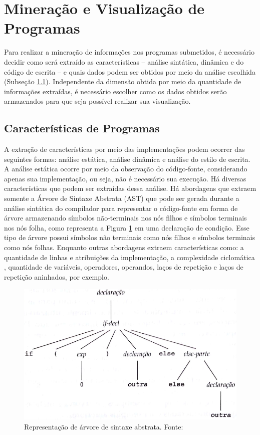 	\section{Mineração e Visualização de Programas}
	\label{sec:MinVisual}
		Para realizar a mineração de informações nos programas submetidos, é necessário
		decidir como será extraído as características -- análise sintática, dinâmica e
		do código de escrita -- e quais dados podem ser obtidos por meio da análise
		escolhida (Subseção \ref{subSec:Caracteristicas}). Independente da dimensão
		obtida por meio da quantidade de informações extraídas, é necessário escolher
		como os dados obtidos serão armazenados para que seja possível realizar sua visualização.
		
		\subsection{Características de Programas}
		\label{subSec:Caracteristicas}

			A extração de características por meio das implementações podem ocorrer das
			seguintes formas: análise estática, análise dinâmica e análise do estilo de escrita.
			A análise estática ocorre por meio da observação do código-fonte, considerando
			apenas sua implementação, ou seja, não é necessário sua execução. Há diversas
			características que podem ser extraídas dessa análise. Há abordagens que extraem
			somente a Árvore de Sintaxe Abstrata (AST) que pode ser gerada durante a análise
			sintática do compilador para representar o código-fonte em forma de árvore
			armazenando símbolos não-terminais nos nós filhos e símbolos terminais nos
			nós folha, como representa a Figura \ref{fig:AST} em uma declaração de condição.
			Esse tipo de árvore possui símbolos não terminais como nós filhos
			e símbolos terminais como nós folhas. Enquanto outras abordagens extraem
			características como: a quantidade de linhas e atribuições da implementação,
			a complexidade ciclomática \cite{mccabe}, quantidade de variáveis, operadores,
			operandos, laços de repetição e laços de repetição aninhados, por exemplo.
						
			\begin{figure}[h]
				\centering
				\includegraphics[width=0.7\linewidth]{imagem/AST}
				\captionsetup{justification=centering}
				\caption[Representação de árvore de sintaxe abstrata]{Representação
				de árvore de sintaxe abstrata. Fonte: }
				\label{fig:AST}
			\end{figure}
			
